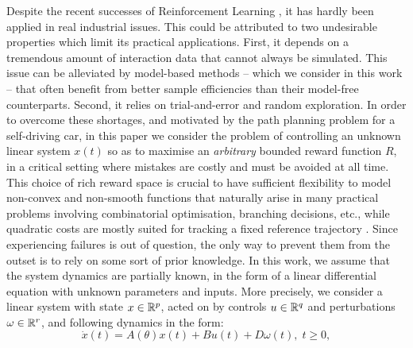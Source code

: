 \documentclass{article}
\begin{document}
Despite the recent successes of Reinforcement Learning \citep[e.g.][]{mnih2015humanlevel,Silver1140}, it has hardly been applied in real industrial issues. This could be attributed to two undesirable properties which limit its practical applications. First, it depends on a tremendous amount of interaction data that cannot always be simulated. This issue can be alleviated by model-based methods -- which we consider in this work -- that often benefit from better sample efficiencies than their model-free counterparts. Second, it relies on trial-and-error and random exploration. In order to overcome these shortages, and motivated by the path planning problem for a self-driving car, in this paper we consider the problem of controlling an unknown linear system $x(t)$ so as to maximise an \emph{arbitrary} bounded reward function $R$, in a critical setting where mistakes are costly and must be avoided at all time. 
This choice of rich reward space is crucial to have sufficient flexibility to model non-convex and non-smooth functions that naturally arise in many practical problems involving combinatorial optimisation, branching decisions, etc., while quadratic costs are mostly suited for tracking a fixed reference trajectory \citep[e.g.][]{Kumar2013}.
Since experiencing failures is out of question, the only way to prevent them from the outset is to rely on some sort of prior knowledge. In this work, we assume that the system dynamics are partially known, in the form of a linear differential equation with unknown parameters and inputs. More precisely, we consider a linear system with state $x\in\mathbb{R}^p$, acted on by controls $u\in\mathbb{R}^q$ and perturbations $\omega\in\mathbb{R}^r$, and following dynamics in the form:
\begin{equation}
\label{eq:dynamics}
\dot{x}(t)=A(\theta)x(t) + B u(t) + D \omega(t),\;t\geq0,
\end{equation}
\end{document}
